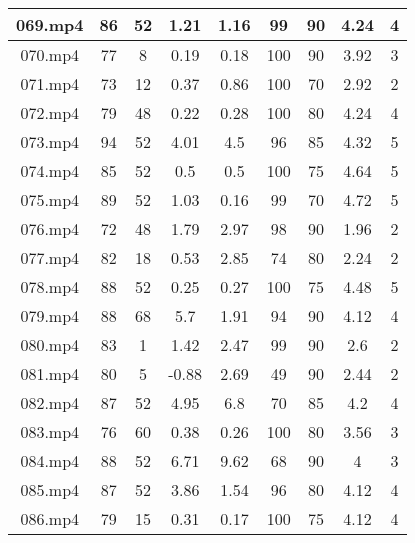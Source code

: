 \begin{enumerate}
\begin{longtable}{|c|c|c|c|c|c|c|c|c|}
		069.mp4 & 86      & 52      & 1.21    & 1.16      & 99          & 90          & 4.24 & 4     \\ \hline
		070.mp4 & 77      & 8       & 0.19    & 0.18      & 100         & 90          & 3.92 & 3     \\ \hline
		071.mp4 & 73      & 12      & 0.37    & 0.86      & 100         & 70          & 2.92 & 2     \\ \hline
		072.mp4 & 79      & 48      & 0.22    & 0.28      & 100         & 80          & 4.24 & 4     \\ \hline
		073.mp4 & 94      & 52      & 4.01    & 4.5       & 96          & 85          & 4.32 & 5     \\ \hline
		074.mp4 & 85      & 52      & 0.5     & 0.5       & 100         & 75          & 4.64 & 5     \\ \hline
		075.mp4 & 89      & 52      & 1.03    & 0.16      & 99          & 70          & 4.72 & 5     \\ \hline
		076.mp4 & 72      & 48      & 1.79    & 2.97      & 98          & 90          & 1.96 & 2     \\ \hline
		077.mp4 & 82      & 18      & 0.53    & 2.85      & 74          & 80          & 2.24 & 2     \\ \hline
		078.mp4 & 88      & 52      & 0.25    & 0.27      & 100         & 75          & 4.48 & 5     \\ \hline
		079.mp4 & 88      & 68      & 5.7     & 1.91      & 94          & 90          & 4.12 & 4     \\ \hline
		080.mp4 & 83      & 1       & 1.42    & 2.47      & 99          & 90          & 2.6  & 2     \\ \hline
		081.mp4 & 80      & 5       & -0.88   & 2.69      & 49          & 90          & 2.44 & 2     \\ \hline
		082.mp4 & 87      & 52      & 4.95    & 6.8       & 70          & 85          & 4.2  & 4     \\ \hline
		083.mp4 & 76      & 60      & 0.38    & 0.26      & 100         & 80          & 3.56 & 3     \\ \hline
		084.mp4 & 88      & 52      & 6.71    & 9.62      & 68          & 90          & 4    & 3     \\ \hline
		085.mp4 & 87      & 52      & 3.86    & 1.54      & 96          & 80          & 4.12 & 4     \\ \hline
		086.mp4 & 79      & 15      & 0.31    & 0.17      & 100         & 75          & 4.12 & 4     \\ \hline

\end{longtable}
\end{enumerate}
